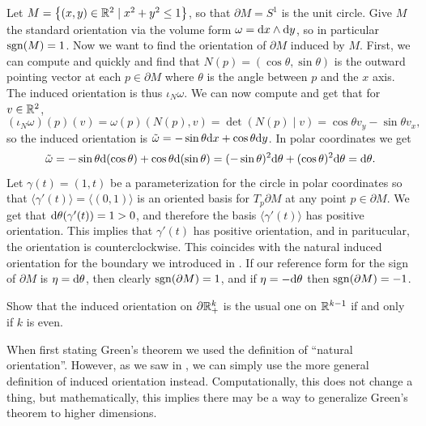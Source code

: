 \documentclass[11pt,a4paper]{article}
\begin{document}
\begin{example}
  \label{exm:induced-orientation}
  Let $M = \left\{(x,y) \in \mathbb{R}^2 \mid x^2 + y^2 \le 1\right\}$,
  so that $\partial M = S^1$ is the unit circle.
  Give $M$ the standard orientation via the volume form
  $\omega = \dx \wedge \dy$, so in particular $\operatorname{sgn}(M) = 1$.
  Now we want to find the orientation of $\partial M$ induced by $M$.
  First, we can compute and quickly and
  find that $N(p) = (\cos\theta,\sin\theta)$ is the outward pointing
  vector at each $p \in \partial M$ where $\theta$ is the angle
  between $p$ and the $x$ axis.
  The induced orientation is thus $\iota_N \omega$.
  We can now compute and get that for $v \in \mathbb{R}^2$,
  \[
    (\iota_N \omega)(p)(v) =
    \omega(p)(N(p),v)  =
    \det(N(p) \mid v) =
    \cos\theta v_y - \sin\theta v_x,
  \]
  so the induced orientation is
  $\tilde \omega = -\sin\theta \dx + \cos\theta \dy$.
  In polar coordinates we get
  \[
    \tilde \omega =
    -\sin\theta \mathrm{d}(\cos\theta) + \cos\theta \mathrm{d}(\sin\theta) =
    (-\sin\theta)^2 \mathrm{d} \theta + (\cos\theta)^2 \mathrm{d} \theta = \mathrm{d} \theta.
  \]
  Let $\gamma(t) = (1,t)$ be a parameterization
  for the circle in polar coordinates so that
  $\langle\gamma'(t)\rangle = \langle(0,1)\rangle$
  is an oriented basis for $T_p \partial M$ at any point $p \in \partial M$.
  We get that $\mathrm{d} \theta(\gamma'(t)) = 1 > 0$,
  and therefore the basis $\langle\gamma'(t)\rangle$ has positive
  orientation.
  This implies that $\gamma'(t)$ has positive orientation,
  and in paritucular, the orientation is counterclockwise.
  This coincides with the natural induced orientation for the boundary
  we introduced in .
  If our reference form for the sign of $\partial M$
  is $\eta = \mathrm{d} \theta$, then clearly $\operatorname{sgn}(\partial M) = 1$,
  and if $\eta = -\mathrm{d} \theta$ then $\operatorname{sgn}(\partial M) = -1$.
\end{example}

\begin{exercise}
  Show that the induced orientation on $\partial \mathbb{R}^k_+$ is the usual one
  on $\mathbb{R}^{k-1}$ if and only if $k$ is even.
\end{exercise}

\begin{remark}
  When first stating Green's theorem we used the definition
  of ``natural orientation''.
  However, as we saw in ,
  we can simply use the more general definition of induced orientation instead.
  Computationally, this does not change a thing,
  but mathematically, this implies there may be a way to generalize
  Green's theorem to higher dimensions.
\end{remark}
\end{document}
